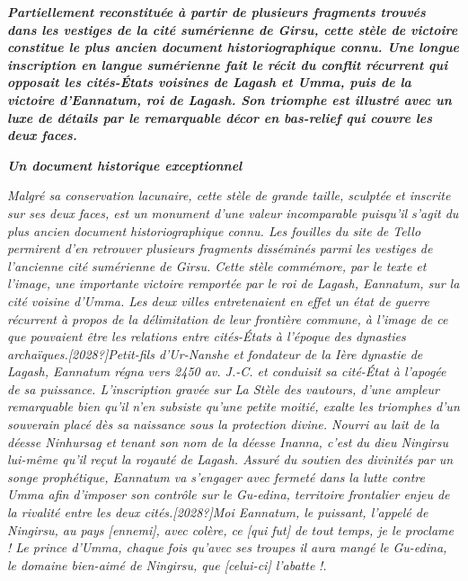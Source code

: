 \documentclass[a4paper]{article}
\begin{document}
\bigskip


\bigskip

{
\textbf{\textit{\textcolor[rgb]{0.101960786,0.101960786,0.101960786}{Partiellement
reconstituée à partir de plusieurs fragments trouvés dans les vestiges
de la cité sumérienne de Girsu, cette stèle de victoire constitue le
plus ancien document historiographique connu. Une longue inscription en
langue sumérienne fait le récit du conflit récurrent qui opposait les
cités-États voisines de Lagash et Umma, puis de la victoire d'Eannatum,
roi de Lagash. Son triomphe est illustré avec un luxe de détails par le
remarquable décor en bas-relief qui couvre les deux faces.}}}}

{
\textbf{\textit{Un document historique exceptionnel}}}

{
\textit{Malgré sa conservation lacunaire, cette stèle de grande taille,
sculptée et inscrite sur ses deux faces, est un monument d'une valeur
incomparable puisqu'il s'agit du plus ancien document historiographique
connu. Les fouilles du site de Tello permirent d'en retrouver plusieurs
fragments disséminés parmi les vestiges de l'ancienne cité sumérienne
de Girsu. Cette stèle commémore, par le texte et l'image, une
importante victoire remportée par le roi de Lagash, Eannatum, sur la
cité voisine d'Umma. Les deux villes entretenaient en effet un état de
guerre récurrent à propos de la délimitation de leur frontière commune,
à l'image de ce que pouvaient être les relations entre cités-États à
l'époque des dynasties archaïques.[2028?]Petit-fils d'Ur-Nanshe et
fondateur de la Ière dynastie de Lagash, Eannatum régna vers 2450 av.
J.-C. et conduisit sa cité-État à l'apogée de sa puissance.
L'inscription gravée sur }\textit{La Stèle des vautours}\textit{, d'une
ampleur remarquable bien qu'il n'en subsiste qu'une petite moitié,
exalte les triomphes d'un souverain placé dès sa naissance sous la
protection divine. Nourri au lait de la déesse Ninhursag et tenant son
nom de la déesse Inanna, c'est du dieu Ningirsu lui-même qu'il reçut la
royauté de Lagash. Assuré du soutien des divinités par un songe
prophétique, Eannatum va s'engager avec fermeté dans la lutte contre
Umma afin d'imposer son contrôle sur le Gu-edina, territoire frontalier
enjeu de la rivalité entre les deux
cités.[2028?]{\textquotedbl}}\textit{Moi Eannatum, le puissant,
l'appelé de Ningirsu, au pays [ennemi], avec colère, ce [qui fut] de
tout temps, je le proclame ! Le prince d'Umma, chaque fois qu'avec ses
troupes il aura mangé le Gu-edina, le domaine bien-aimé de Ningirsu,
que [celui-ci] l'abatte }\textit{!{\textquotedbl}.}}
\end{document}
